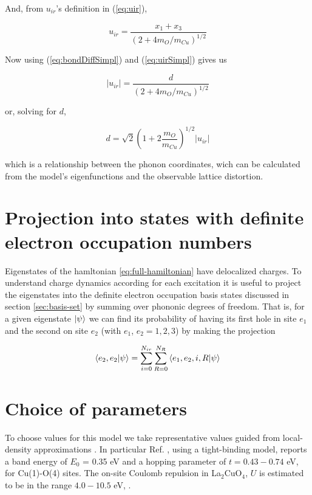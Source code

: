 And, from $u_{ir}$'s definition in (\ref{eq:uir}),

\begin{equation}\label{eq:uirSimpl}
u_{ir}=\frac{x_1+x_3}{\left( 2+4 m_O/m_{Cu} \right)^{1/2}}
\end{equation}

Now using (\ref{eq:bondDiffSimpl}) and (\ref{eq:uirSimpl}) gives us

\begin{equation}\label{eq:uirvsd}
\left|u_{ir}\right|=\frac{d}{\left( 2+4 m_O/m_{Cu} \right)^{1/2}}
\end{equation}

or, solving for $d$,

\begin{equation}\label{eq:dvsuir}
d=\sqrt{2}\left(1 + 2\frac{m_O}{m_{Cu}} \right)^{1/2}\left|u_{ir}\right|
\end{equation}

which is a relationship between the phonon coordinates, wich can be calculated from the model's eigenfunctions and the observable lattice distortion.

\section{Projection into states with definite electron occupation numbers}

Eigenstates of the hamltonian \ref{eq:full-hamiltonian} have delocalized charges.
To understand charge dynamics according for each excitation it is useful to project the eigenstates into the definite electron occupation basis states discussed in section \ref{sec:basis-set} by summing over phononic degrees of freedom.
That is, for a given eigenstate $\left | \psi \right\rangle$ we can find its probability of having its first hole in site $e_1$ and the second on site $e_2$ (with $e_1$, $e_2=1,2,3$) by making the projection

\begin{equation}\label{eq:electron-occupation}
\left\langle e_2,e_2|\psi\right\rangle = \sum_{i=0}^{N_{ir}}\sum_{R=0}^{N_R} \left\langle e_1,e_2,i,R|\psi\right\rangle
\end{equation}

\section{Choice of parameters}

To choose values for this model we take representative values guided from local-density approximations \cite{Pickett1989}. 
In particular Ref. \cite{DeWeert1989}, using a tight-binding model, reports a band energy of $E_0$ = 0.35 eV and a hopping parameter of $t=0.43-0.74$ eV, for Cu(1)-O(4) sites.
The on-site Coulomb repulsion in La$_2$CuO$_4$, $U$  is estimated to be in the range $4.0-10.5$ eV, \cite{Hybertsen1989}. 

